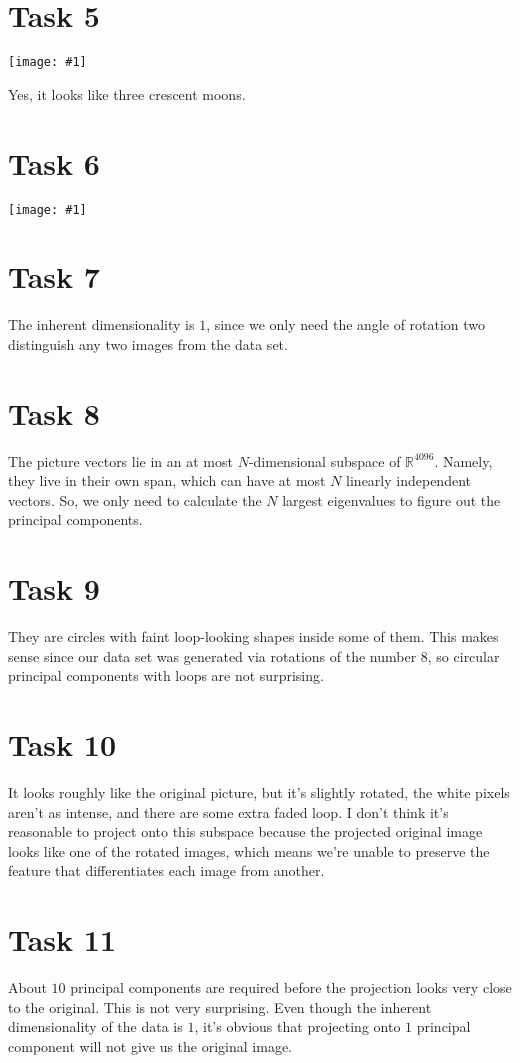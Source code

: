 \documentclass{article}
\newcommand{\R}{\mathbb{R}}
\newcommand{\image}[2]{\begin{center}\texttt{[image: \#1]}\end{center}}
\begin{document}
\section*{Task 5}
\image{images/projected-plot.png}{0.65}
Yes, it looks like three crescent moons.

\section*{Task 6}
\image{images/rotated-image.png}{0.2}

\section*{Task 7}
The inherent dimensionality is $1$, since we only need the angle of rotation two distinguish any two images from the data set.

\section*{Task 8}
The picture vectors lie in an at most $N$-dimensional subspace of $\R^{4096}$. Namely, they live in their own span, which can have at most $N$ linearly independent vectors. So, we only need to calculate the $N$ largest eigenvalues to figure out the principal components.

\section*{Task 9}
They are circles with faint loop-looking shapes inside some of them. This makes sense since our data set was generated via rotations of the number $8$, so circular principal components with loops are not surprising.

\section*{Task 10}
It looks roughly like the original picture, but it's slightly rotated, the white pixels aren't as intense, and there are some extra faded loop. I don't think it's reasonable to project onto this subspace because the projected original image looks like one of the rotated images, which means we're unable to preserve the feature that differentiates each image from another.

\section*{Task 11}
About $10$ principal components are required before the projection looks very close to the original. This is not very surprising. Even though the inherent dimensionality of the data is $1$, it's obvious that projecting onto $1$ principal component will not give us the original image.
\end{document}
